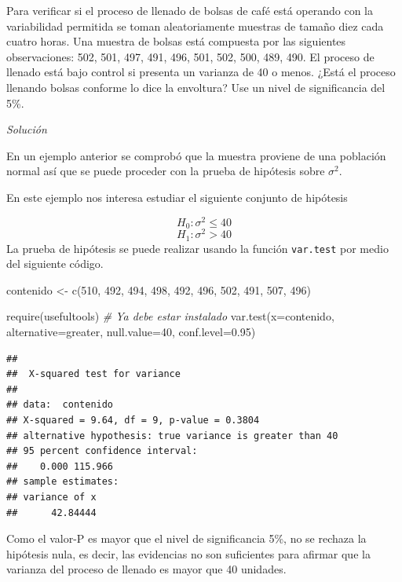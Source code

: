 \documentclass[
]{book}
\makeatletter
\newenvironment{Shaded}{\begin{snugshade}}{\end{snugshade}}
\newcommand{\AttributeTok}[1]{\textcolor[rgb]{0.77,0.63,0.00}{#1}}
\newcommand{\CommentTok}[1]{\textcolor[rgb]{0.56,0.35,0.01}{\textit{#1}}}
\newcommand{\DecValTok}[1]{\textcolor[rgb]{0.00,0.00,0.81}{#1}}
\newcommand{\FloatTok}[1]{\textcolor[rgb]{0.00,0.00,0.81}{#1}}
\newcommand{\FunctionTok}[1]{\textcolor[rgb]{0.00,0.00,0.00}{#1}}
\newcommand{\NormalTok}[1]{#1}
\newcommand{\OtherTok}[1]{\textcolor[rgb]{0.56,0.35,0.01}{#1}}
\newcommand{\StringTok}[1]{\textcolor[rgb]{0.31,0.60,0.02}{#1}}
\newenvironment{kframe}{%
\medskip{}
\setlength{\fboxsep}{.8em}
 \def\at@end@of@kframe{}%
 \ifinner\ifhmode%
  \def\at@end@of@kframe{\end{minipage}}%
  \begin{minipage}{\columnwidth}%
 \fi\fi%
 \def\FrameCommand##1{\hskip\@totalleftmargin \hskip-\fboxsep
 \colorbox{shadecolor}{##1}\hskip-\fboxsep
     \hskip-\linewidth \hskip-\@totalleftmargin \hskip\columnwidth}%
 \MakeFramed {\advance\hsize-\width
   \@totalleftmargin\z@ \linewidth\hsize
   \@setminipage}}%
 {\par\unskip\endMakeFramed%
 \at@end@of@kframe}
\renewenvironment{Shaded}{\begin{kframe}}{\end{kframe}}
\makeatother
\begin{document}
Para verificar si el proceso de llenado de bolsas de café está operando con la variabilidad permitida se toman aleatoriamente muestras de tamaño diez cada cuatro horas. Una muestra de bolsas está compuesta por las siguientes observaciones: 502, 501, 497, 491, 496, 501, 502, 500, 489, 490. El proceso de llenado está bajo control si presenta un varianza de 40 o menos. ¿Está el proceso llenando bolsas conforme lo dice la envoltura? Use un nivel de significancia del 5\%.

\emph{Solución}

En un ejemplo anterior se comprobó que la muestra proviene de una población normal así que se puede proceder con la prueba de hipótesis sobre \(\sigma^2\).

En este ejemplo nos interesa estudiar el siguiente conjunto de hipótesis

\[H_0: \sigma^2 \leq 40\]
\[H_1: \sigma^2 > 40\]
La prueba de hipótesis se puede realizar usando la función \texttt{var.test} por medio del siguiente código.

\begin{Shaded}
\begin{Highlighting}[]
\NormalTok{contenido }\OtherTok{\textless{}{-}} \FunctionTok{c}\NormalTok{(}\DecValTok{510}\NormalTok{, }\DecValTok{492}\NormalTok{, }\DecValTok{494}\NormalTok{, }\DecValTok{498}\NormalTok{, }\DecValTok{492}\NormalTok{,}
               \DecValTok{496}\NormalTok{, }\DecValTok{502}\NormalTok{, }\DecValTok{491}\NormalTok{, }\DecValTok{507}\NormalTok{, }\DecValTok{496}\NormalTok{)}

\FunctionTok{require}\NormalTok{(usefultools)  }\CommentTok{\# Ya debe estar instalado}
\FunctionTok{var.test}\NormalTok{(}\AttributeTok{x=}\NormalTok{contenido, }\AttributeTok{alternative=}\StringTok{\textquotesingle{}greater\textquotesingle{}}\NormalTok{,}
         \AttributeTok{null.value=}\DecValTok{40}\NormalTok{, }\AttributeTok{conf.level=}\FloatTok{0.95}\NormalTok{)}
\end{Highlighting}
\end{Shaded}

\begin{verbatim}
## 
##  X-squared test for variance
## 
## data:  contenido
## X-squared = 9.64, df = 9, p-value = 0.3804
## alternative hypothesis: true variance is greater than 40
## 95 percent confidence interval:
##    0.000 115.966
## sample estimates:
## variance of x 
##      42.84444
\end{verbatim}

Como el valor-P es mayor que el nivel de significancia 5\%, no se rechaza la hipótesis nula, es decir, las evidencias no son suficientes para afirmar que la varianza del proceso de llenado es mayor que 40 unidades.
\end{document}

